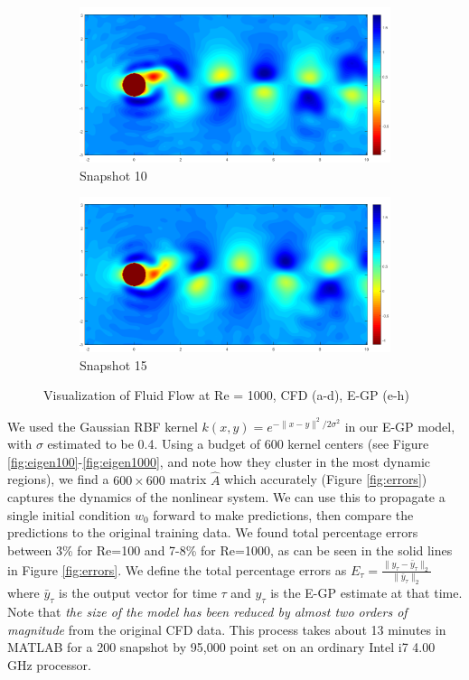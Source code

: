 \documentclass[letterpaper,12pt,peerreviewca,draftcls]{IEEEtran}
\newcommand{\s}{\sigma}
\newcommand{\weight}{w}
\newcommand{\kernel}{k}
\newcommand{\dualop}{A}
\newcommand{\dualopApprox}{\widehat{\dualop}}
\newcommand{\tindex}{\tau}
\begin{document}
\begin{figure}[h]
	\begin{subfigure}[t]{0.23\textwidth}
		\includegraphics[width=\linewidth]{"Figure S7g"}
		\caption{Snapshot 10}
	\end{subfigure}
	\begin{subfigure}[t]{0.23\textwidth}
		\includegraphics[width=\linewidth]{"Figure S7h"}
		\caption{Snapshot 15}
	\end{subfigure}
	\caption{Visualization of Fluid Flow at Re = 1000, CFD (a-d), E-GP (e-h)}
	\label{fig:cfd_1000}
\end{figure}

We used the Gaussian RBF kernel $\kernel(x,y) = e^{-\|x-y\|^2/2\s^2}$ in our E-GP model, with $\s$ estimated to be 0.4. Using a budget of 600 kernel centers (see Figure \ref{fig:eigen100}-\ref{fig:eigen1000}, and note how they cluster in the most dynamic regions), we find a $600\times600$ matrix $\dualopApprox$ which accurately (Figure \ref{fig:errors}) captures the dynamics of the nonlinear system. We can use this to propagate a single initial condition $\weight_{0}$ forward to make predictions, then compare the predictions to the original training data. We found total percentage errors between 3\% for Re=100 and 7-8\% for Re=1000, as can be seen in the solid lines in Figure \ref{fig:errors}. We define the total percentage errors as
$E_\tindex = \frac{\|y_\tindex-\bar y_\tindex\|_2}{\|\bar y_\tindex\|_2}$
where $\bar y_\tindex$ is the output vector for time $\tindex$ and $y_\tindex$ is the E-GP estimate at that time. Note that \emph{the size of the model has been reduced by almost two orders of magnitude} from the original CFD data. This process takes about 13 minutes in MATLAB for a 200 snapshot by 95,000 point set on an ordinary Intel i7 4.00 GHz processor.
\end{document}
